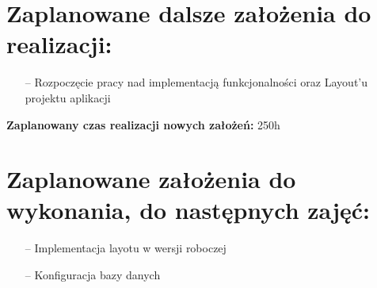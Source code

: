 \documentclass[12pt,a4paper]{article}
\begin{document}
\section{Zaplanowane dalsze założenia do realizacji:}
\begin{itemize}
   \item [--] Rozpoczęcie pracy nad implementacją funkcjonalności oraz Layout’u projektu aplikacji
\end{itemize}
\textbf{ Zaplanowany czas realizacji nowych założeń:  }250h
 
\section{Zaplanowane założenia do wykonania, do następnych zajęć:}
\begin{itemize}
   \item [--] Implementacja layotu w wersji roboczej
   \item [--] Konfiguracja bazy danych
\end{itemize}
\end{document}
